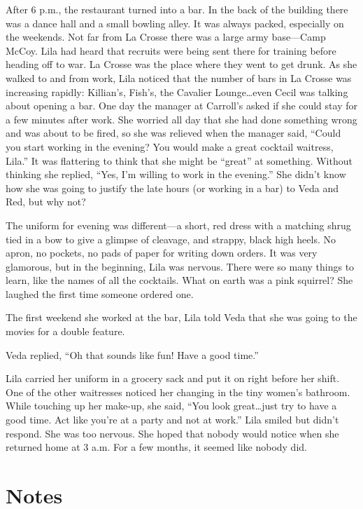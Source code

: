 \documentclass[
  letterpaper,
]{book}
\begin{document}
After 6 p.m., the restaurant turned into a bar. In the back of the
building there was a dance hall and a small bowling alley. It was always
packed, especially on the weekends. Not far from La Crosse there was a
large army base---Camp McCoy. Lila had heard that recruits were being
sent there for training before heading off to war. La Crosse was the
place where they went to get drunk. As she walked to and from work, Lila
noticed that the number of bars in La Crosse was increasing rapidly:
Killian's, Fish's, the Cavalier Lounge\ldots even Cecil was talking
about opening a bar. One day the manager at Carroll's asked if she could
stay for a few minutes after work. She worried all day that she had done
something wrong and was about to be fired, so she was relieved when the
manager said, ``Could you start working in the evening? You would make a
great cocktail waitress, Lila.'' It was flattering to think that she
might be ``great'' at something. Without thinking she replied, ``Yes,
I'm willing to work in the evening.'' She didn't know how she was going
to justify the late hours (or working in a bar) to Veda and Red, but why
not?

The uniform for evening was different---a short, red dress with a
matching shrug tied in a bow to give a glimpse of cleavage, and strappy,
black high heels. No apron, no pockets, no pads of paper for writing
down orders. It was very glamorous, but in the beginning, Lila was
nervous. There were so many things to learn, like the names of all the
cocktails. What on earth was a pink squirrel? She laughed the first time
someone ordered one.

The first weekend she worked at the bar, Lila told Veda that she was
going to the movies for a double feature.

Veda replied, ``Oh that sounds like fun! Have a good time.''

Lila carried her uniform in a grocery sack and put it on right before
her shift. One of the other waitresses noticed her changing in the tiny
women's bathroom. While touching up her make-up, she said, ``You look
great\ldots just try to have a good time. Act like you're at a party and
not at work.'' Lila smiled but didn't respond. She was too nervous. She
hoped that nobody would notice when she returned home at 3 a.m. For a
few months, it seemed like nobody did.

\section{Notes}\label{notes-28}
\end{document}
